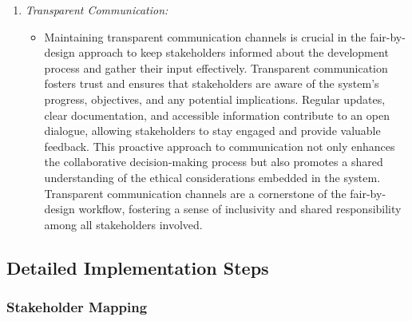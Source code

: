 \documentclass[12pt,a4paper,openright,twoside]{book}
\begin{document}
\begin{enumerate}
\begin{itemize}
    \end{itemize}
    
    \item \emph{Transparent Communication:}
    
    \begin{itemize}
    
        \item Maintaining transparent communication channels is crucial in the fair-by-design approach to keep stakeholders informed about the development process and gather their input effectively. Transparent communication fosters trust and ensures that stakeholders are aware of the system's progress, objectives, and any potential implications. Regular updates, clear documentation, and accessible information contribute to an open dialogue, allowing stakeholders to stay engaged and provide valuable feedback. This proactive approach to communication not only enhances the collaborative decision-making process but also promotes a shared understanding of the ethical considerations embedded in the system. Transparent communication channels are a cornerstone of the fair-by-design workflow, fostering a sense of inclusivity and shared responsibility among all stakeholders involved.
    
    \end{itemize}

\end{enumerate}

\subsection{Detailed Implementation Steps}

\subsubsection{Stakeholder Mapping}
\end{document}
